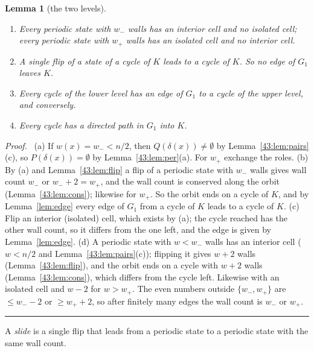 \documentclass[10pt,a4paper]{article}
\newtheorem{lemma}[theorem]{Lemma}
\newcommand{\qedmark}{\rule{1.1ex}{1.1ex}}
\newenvironment{proof}[1][Proof]{\par\smallskip\noindent\textit{#1.}\ }{\hfill\qedmark\par\smallskip}
\newcommand{\Gone}{G_1}                       %
\begin{document}
\begin{lemma}[the two levels]\label{43:lem:levels}
\begin{enumerate}[label=(\alph*),nosep,leftmargin=*]
\item Every periodic state with $w_-$ walls has an interior cell and no isolated cell; every periodic state with
$w_+$ walls has an isolated cell and no interior cell.
\item A single flip of a state of a cycle of $K$ leads to a cycle of $K$. So no edge of $\Gone$ leaves $K$.
\item Every cycle of the lower level has an edge of $\Gone$ to a cycle of the upper level, and conversely.
\item Every cycle has a directed path in $\Gone$ into $K$.
\end{enumerate}
\end{lemma}
\begin{proof}
(a) If $w(x)=w_-<n/2$, then $Q(\delta(x))\ne\emptyset$ by Lemma~\ref{43:lem:pairs}(c), so
$P(\delta(x))=\emptyset$ by Lemma~\ref{43:lem:per}(a). For $w_+$ exchange the roles.
(b) By (a) and Lemma~\ref{43:lem:flip} a flip of a periodic state with $w_-$ walls gives wall count $w_-$ or
$w_-+2=w_+$, and the wall count is conserved along the orbit (Lemma~\ref{43:lem:cons}); likewise for $w_+$. So the
orbit ends on a cycle of $K$, and by Lemma~\ref{lem:edge} every edge of $\Gone$ from a cycle of $K$ leads to a cycle
of $K$.
(c) Flip an interior (isolated) cell, which exists by (a); the cycle reached has the other wall count, so it
differs from the one left, and the edge is given by Lemma~\ref{lem:edge}.
(d) A periodic state with $w<w_-$ walls has an interior cell ($w<n/2$ and Lemma~\ref{43:lem:pairs}(c)); flipping
it gives $w+2$ walls (Lemma~\ref{43:lem:flip}), and the orbit ends on a cycle with $w+2$ walls
(Lemma~\ref{43:lem:cons}), which differs from the cycle left. Likewise with an isolated cell and $w-2$ for
$w>w_+$. The even numbers outside $\{w_-,w_+\}$ are $\le w_--2$ or $\ge w_++2$, so after finitely many edges the
wall count is $w_-$ or $w_+$.
\end{proof}

A \emph{slide} is a single flip that leads from a periodic state to a periodic state with the same wall count.
\end{document}
